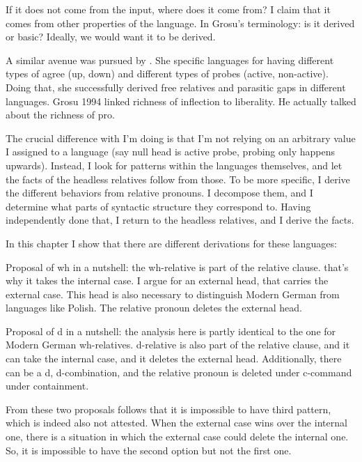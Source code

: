 If it does not come from the input, where does it come from? I claim that it comes from other properties of the language. In Grosu's terminology: is it derived or basic? Ideally, we would want it to be derived.

A similar avenue was pursued by \citealt{himmelreich2017}. She specific languages for having different types of agree (up, down) and different types of probes (active, non-active). Doing that, she successfully derived free relatives and parasitic gaps in different languages. Grosu 1994 linked richness of inflection to liberality. He actually talked about the richness of pro.


The crucial difference with I'm doing is that I'm not relying on an arbitrary value I assigned to a language (say null head is active probe, probing only happens upwards). Instead, I look for patterns within the languages themselves, and let the facts of the headless relatives follow from those. To be more specific, I derive the different behaviors from relative pronouns. I decompose them, and I determine what parts of syntactic structure they correspond to. Having independently done that, I return to the headless relatives, and I derive the facts.


In this chapter I show that there are different derivations for these languages:



Proposal of wh in a nutshell: the wh-relative is part of the relative clause. that's why it takes the internal case. I argue for an external head, that carries the external case. This head is also necessary to distinguish Modern German from languages like Polish. The relative pronoun deletes the external head.

Proposal of d in a nutshell: the analysis here is partly identical to the one for Modern German wh-relatives. d-relative is also part of the relative clause, and it can take the internal case, and it deletes the external head. Additionally, there can be a d, d-combination, and the relative pronoun is deleted under c-command under containment.

From these two proposals follows that it is impossible to have third pattern, which is indeed also not attested. When the external case wins over the internal one, there is a situation in which the external case could delete the internal one. So, it is impossible to have the second option but not the first one.


